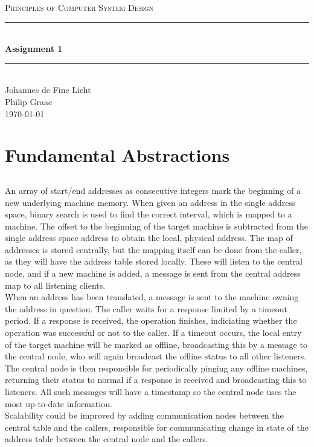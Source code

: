 \documentclass[12pt]{article}
\newcommand{\HRule}{\rule{\linewidth}{0.5mm}}
\begin{document}
\begin{center}
\textsc{\LARGE Principles of Computer System Design}\\[0.3cm] %
\HRule \\[0.4cm]
{ \huge \bfseries Assignment 1} %
\HRule \\[0.4cm]
\large
Johannes de Fine Licht %
\\Philip Graae
\\\today
\end{center}

\section{Fundamental Abstractions} %

\subsection{} %
An array of start/end addresses as consecutive integers mark the beginning of a new underlying machine memory. When given an address in the single address space, binary search is used to find the correct interval, which is mapped to a machine. The offset to the beginning of the target machine is subtracted from the single address space address to obtain the local, physical address. The map of addresses is stored centrally, but the mapping itself can be done from the caller, as they will have the address table stored locally. These will listen to the central node, and if a new machine is added, a message is sent from the central address map to all listening clients. \\
When an address has been translated, a message is sent to the machine owning the address in question. The caller waits for a response limited by a timeout period. If a response is received, the operation finishes, indiciating whether the operation was successful or not to the caller. If a timeout occurs, the local entry of the target machine will be marked as offline, broadcasting this by a message to the central node, who will again broadcast the offline status to all other listeners. The central node is then responsible for periodically pinging any offline machines, returning their status to normal if a response is received and broadcasting this to listeners. All such messages will have a timestamp so the central node uses the most up-to-date information.\\
Scalability could be improved by adding communication nodes between the central table and the callers, responsible for communicating change in state of the address table between the central node and the callers.
\end{document}
